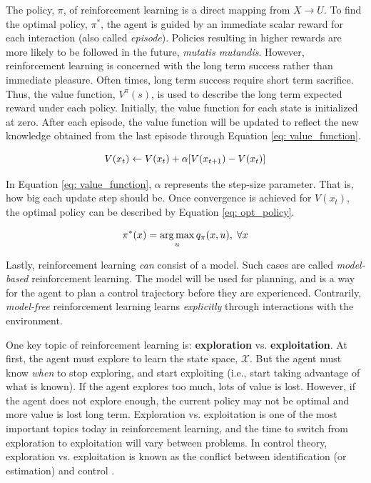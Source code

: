 The policy, $\pi$, of reinforcement learning is a direct mapping from $X \rightarrow U$.  To find the optimal policy, $\pi^*$, the agent is guided by an immediate scalar reward for each interaction (also called \textit{episode}). Policies resulting in higher rewards are more likely to be followed in the future, \textit{mutatis mutandis}.  However, reinforcement learning is concerned with the long term success rather than immediate pleasure. Often times, long term success require short term sacrifice.  Thus, the value function, $V^{\pi}(s)$, is used to describe the long term expected reward under each policy.  Initially, the value function for each state is initialized at zero.  After each episode, the value function will be updated to reflect the new knowledge obtained from the last episode through Equation \ref{eq: value_function}.

\begin{equation}
    \centering
    V(x_t) \leftarrow V(x_t) + \alpha [V(x_{t + 1}) - V(x_t)]
    \label{eq: value_function}
\end{equation}

In Equation \ref{eq: value_function}, $\alpha$ represents the step-size parameter.  That is, how big each update step should be.  Once convergence is achieved for $V(x_t)$, the optimal policy can be described by Equation \ref{eq: opt_policy}.  

\begin{equation}
    \centering
    \pi^*(x) = \argmax_u q_{\pi}(x, u), \; \forall x 
    \label{eq: opt_policy}
\end{equation}

Lastly, reinforcement learning \textit{can} consist of a model. Such cases are called \textit{model-based} reinforcement learning.  The model will be used for planning, and is a way for the agent to plan a control trajectory before they are experienced.  Contrarily, \textit{model-free} reinforcement learning learns \textit{explicitly} through interactions with the environment.

One key topic of reinforcement learning is: \textbf{exploration} vs. \textbf{exploitation}.  At first, the agent must explore to learn the state space, $\mathcal{X}$.  But the agent must know \textit{when} to stop exploring, and start exploiting (i.e., start taking advantage of what is known).  If the agent explores too much, lots of value is lost.  However, if the agent does not explore enough, the current policy may not be optimal and more value is lost long term.  Exploration vs. exploitation is one of the most important topics today in reinforcement learning, and the time to switch from exploration to exploitation will vary between problems.  In control theory, exploration vs. exploitation is known as the conflict between identification (or estimation) and control \cite{explorevexploitcontrol}.  

